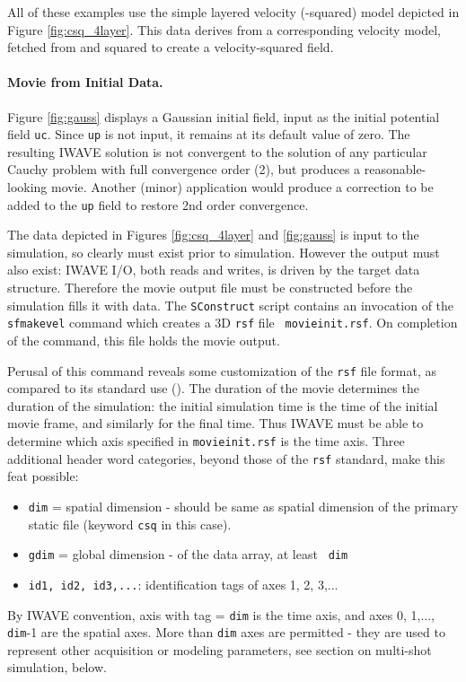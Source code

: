All of these examples use the simple layered velocity
(-squared) model depicted in Figure \ref{fig:csq_4layer}. 
This data derives from a corresponding velocity model, fetched from
and squared to create a velocity-squared field.


\noindent \paragraph{Movie from Initial Data.} 
Figure \ref{fig:gauss}
displays a Gaussian initial field, input as the initial potential
field {\tt uc}.  Since  {\tt up} is not input, it remains at its
default value of zero. The resulting IWAVE solution is not convergent
to the solution of any particular Cauchy problem with full convergence
order (2), but produces a reasonable-looking movie. Another (minor)
application would produce a correction to be added to the {\tt up}
field to restore 2nd order convergence.


The data depicted in Figures \ref{fig:csq_4layer} and \ref{fig:gauss}
is input to the simulation, so clearly must exist prior to
simulation. However the output must also exist: IWAVE I/O, both reads
and writes, is driven by the target data structure. Therefore the
movie output file must be constructed before the simulation fills it
with data. The {\tt SConstruct} script contains an invocation of the
{\tt sfmakevel} command which creates a 3D {\tt rsf} file {\tt
  movieinit.rsf}. On completion of the command, this file holds the
movie output.

Perusal of this command reveals some customization of the {\tt rsf}
file format, as compared to its standard use (\cite{Madagascar}). The
duration of the movie determines the duration of the simulation: the
initial simulation time is the time of the initial movie frame, and
similarly for the final time. Thus IWAVE must be able to determine
which axis specified in {\tt movieinit.rsf} is the time axis. Three
additional header word categories, beyond those of the {\tt rsf}
standard, make this feat possible:
\begin{itemize}
\item {\tt dim} = spatial dimension - should be same as spatial
  dimension of the primary static file (keyword {\tt csq} in this
  case).
\item {\tt gdim} = global dimension - of the data array, at least {\tt
    dim}
\item {\tt id1, id2, id3,...}: identification tags of axes 1, 2, 3,...
\end{itemize}
By IWAVE convention, axis with tag = {\tt dim} is the time axis, and axes 0,
1,..., {\tt dim}-1 are the spatial axes. More than {\tt dim} axes are
permitted - they are used to represent other acquisition or modeling
parameters, see section on multi-shot simulation, below.

